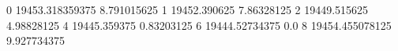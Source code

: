 0 19453.318359375 8.791015625
1 19452.390625 7.86328125
2 19449.515625 4.98828125
4 19445.359375 0.83203125
6 19444.52734375 0.0
8 19454.455078125 9.927734375
